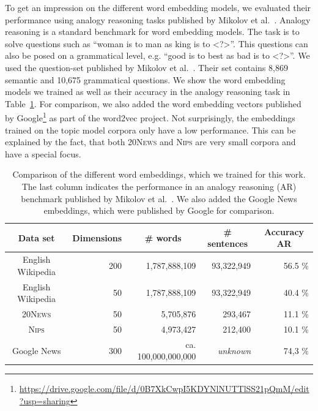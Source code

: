 \documentclass[
        a4paper,
        titlepage,
        twoside,
        parskip
        ]{scrbook}
\newcommand{\ra}[1]{\renewcommand{\arraystretch}{#1}}
\theoremstyle{break}
\begin{document}
To get an impression on the different word embedding models, we evaluated their performance using analogy reasoning tasks published by Mikolov et al.~\cite{Mikolov2013}.
Analogy reasoning is a standard benchmark for word embedding models.
The task is to solve questions such as ``woman is to man as king is to \textless?\textgreater''.
This questions can also be posed on a grammatical level, e.g. ``good is to best as bad is to \textless?\textgreater''.
We used the question-set published by Mikolov et al.~\cite{Mikolov2013b}.
Their set contains 8,869 semantic and 10,675 grammatical questions.
We show the word embedding models we trained as well as their accuracy in the analogy reasoning task in Table~\ref{table:word_embeddings_performance}.
For comparison, we also added the word embedding vectors published by Google\footnote{\url{https://drive.google.com/file/d/0B7XkCwpI5KDYNlNUTTlSS21pQmM/edit?usp=sharing}} as part of the word2vec project.
Not surprisingly, the embeddings trained on the topic model corpora only have a low performance.
This can be explained by the fact, that both \textsc{20News} and \textsc{Nips} are very small corpora and have a special focus.

\begin{table}[]
  \ra{1.3}
  \centering
  \caption{Comparison of the different word embeddings, which we trained for this work.
  The last column indicates the performance in an analogy reasoning (AR) benchmark published by Mikolov et al.~\cite{Mikolov2013b}.
  We also added the Google News embeddings, which were published by Google for comparison.}
  \label{table:word_embeddings_performance}
  \begin{tabular}{crrrr}
    \toprule
    \multicolumn{1}{c}{Data set} & \multicolumn{1}{c}{Dimensions} & \multicolumn{1}{c}{\# words} & \multicolumn{1}{c}{\# sentences} & \multicolumn{1}{c}{Accuracy AR} \\
    \midrule
    English Wikipedia & 200                 & 1,787,888,109     & 93,322,949            & 56.5 \%              \\
    English Wikipedia & 50                  & 1,787,888,109     & 93,322,949            & 40.4 \%              \\
    \textsc{20News}            & 50                  & 5,705,876         & 293,467               & 11.1 \%              \\
    \textsc{Nips}              & 50                  & 4,973,427         & 212,400               & 10.1 \%              \\
    Google News       & 300                 & ca. 100,000,000,000       & \textit{unknown}      & 74,3 \%              \\
    \bottomrule
  \end{tabular}
\end{table}
\end{document}
